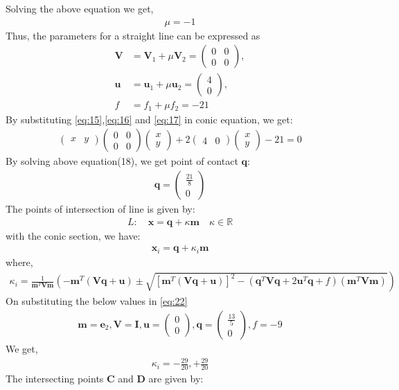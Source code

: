\documentclass[12pt]{article}
\newcommand{\myvec}[1]{\ensuremath{\begin{pmatrix}#1\end{pmatrix}}}
\let\vec\mathbf
\let\vec\mathbf
\providecommand{\brak}[1]{\ensuremath{\left(#1\right)}}
\providecommand{\lbrak}[1]{\ensuremath{\left(#1\right.}}
\providecommand{\rbrak}[1]{\ensuremath{\left.#1\right)}}
\providecommand{\sbrak}[1]{\ensuremath{{}\left[#1\right]}}
\providecommand{\brak}[1]{\ensuremath{\left(#1\right)}}
\let\vec\mathbf
\begin{document}
Solving the above equation we get,
\begin{align}
    \mu = -1
\end{align}
Thus, the parameters for a straight line can be expressed as
 \begin{align}
 \label{eq:15}
	\vec{V} &= 
\vec{V}_1 + \mu\vec{V}_2
=\myvec{ 0 & 0 \\ 0 & 0},
\\ \label{eq:16}
	\vec{u} &=
\vec{u}_1+\mu \vec{u}_2
	= \myvec{
4\\
0
},
\\ \label{eq:17}
f&=f_1 + \mu f_2=-21
\end{align}
By substituting \eqref{eq:15},\eqref{eq:16} and \eqref{eq:17} in conic equation, we get:
\begin{align}
\myvec{x&y}\myvec{0&0\\0&0}\myvec{x\\y}+2\myvec{4&0}\myvec{x\\y}-21=0
\end{align}
By solving above equation(18), we get point of contact $\vec{q}$:
\begin{align}
\vec{q}=\myvec{\frac{21}{8}\\[2pt]0}
\end{align}
The points of intersection of line is given by: 
\begin{align}
L: \quad \vec{x} = \vec{q} + \kappa \vec{m} \quad \kappa \in \mathbb{R}
\end{align}
with the conic section, we have:
 \begin{align}
 \vec{x}_i = \vec{q} + \kappa_i \vec{m}
 \end{align}
 where, 
\begin{align}
\kappa_i = \frac{1}
{\vec{m}^T\vec{V}\vec{m}}
\lbrak{-\vec{m}^T\brak{\vec{V}\vec{q}+\vec{u}}}
\pm
\rbrak{\sqrt{
\sbrak{
\vec{m}^T\brak{\vec{V}\vec{q}+\vec{u}}
}^2
-
\brak
{
\vec{q}^T\vec{V}\vec{q} + 2\vec{u}^T\vec{q} +f
}
\brak{\vec{m}^T\vec{V}\vec{m}}
}
}
\label{eq:22}
\end{align}
On substituting the below values in \eqref{eq:22}
\begin{align}
 \vec{m}=\vec{e}_2,\vec{V}=\vec{I},\vec{u}=\myvec{0\\0},\vec{q}=\myvec{\frac{13}{5}\\[2pt]0},f=-9
\end{align}
We get,
\begin{align}
\kappa_i=-\frac{29}{20},+\frac{29}{20}
\end{align}
The intersecting points $\vec{C}$ and $\vec{D}$ are given by:
\end{document}
